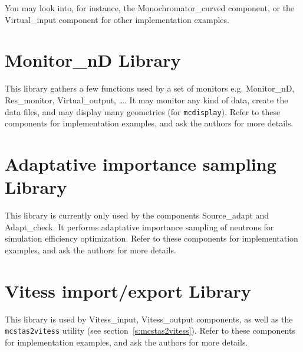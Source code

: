 You may look into, for instance, the Monochromator\_curved component, or the Virtual\_input component for other implementation examples.

\section{Monitor\_nD Library}

This library gathers a few functions used by a set of monitors e.g. Monitor\_nD, Res\_monitor, Virtual\_output, \ldots.
It may monitor any kind of data, create the data files, and may display many geometries (for \verb+mcdisplay+).
Refer to these components for implementation examples, and ask the authors for more details.

\section{Adaptative importance sampling Library}

This library is currently only used by the components Source\_adapt
and Adapt\_check. It performs adaptative importance sampling of neutrons for simulation efficiency optimization.
Refer to these components for implementation examples, and ask the authors for more details.

\section{Vitess import/export Library}

This library is used by Vitess\_input, Vitess\_output components, as well as the \verb+mcstas2vitess+ utility (see section~\ref{s:mcstas2vitess}). 
Refer to these components for implementation examples, and ask the authors for more details.

